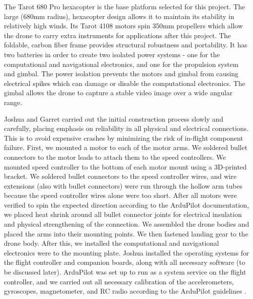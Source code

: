 The Tarot 680 Pro hexacopter is the base platform selected for this project. The large (680mm radius), hexacopter design allows it to maintain its stability in relatively high winds. Its Tarot 4108 motors spin 350mm propellers which allow the drone to carry extra instruments for applications after this project. The foldable, carbon fiber frame provides structural robustness and portability. It has two batteries in order to create two isolated power systems - one for the computational and navigational electronics, and one for the propulsion system and gimbal. The power isolation prevents the motors and gimbal from causing electrical spikes which can damage or disable the computational electronics. The gimbal allows the drone to capture a stable video image over a wide angular range. 

Joshua and Garret carried out the initial construction process slowly and carefully, placing emphasis on reliability in all physical and electrical connections. This is to avoid expensive crashes by minimizing the risk of in-flight component failure. First, we mounted a motor to each of the motor arms. We soldered bullet connectors to the motor leads to attach them to the speed controllers. We mounted speed controller to the bottom of each motor mount using a 3D-printed bracket. We soldered bullet connectors to the speed controller wires, and wire extensions (also with bullet connectors) were run through the hollow arm tubes because the speed controller wires alone were too short. After all motors were verified to spin the expected direction according to the ArduPilot documentation, we placed heat shrink around all bullet connector joints for electrical insulation and physical strengthening of the connection. We assembled the drone bodies and placed the arms into their mounting points. We then fastened landing gear to the drone body. After this, we installed the computational and navigational electronics were to the mounting plate. Joshua installed the operating systems for the flight controller and companion boards, along with all necessary software (to be discussed later). ArduPilot was set up to run as a system service on the flight controller, and we carried out all necessary calibration of the accelerometers, gyroscopes, magnetometer, and RC radio according to the ArduPilot guidelines \cite{ardupilot_setup}.


